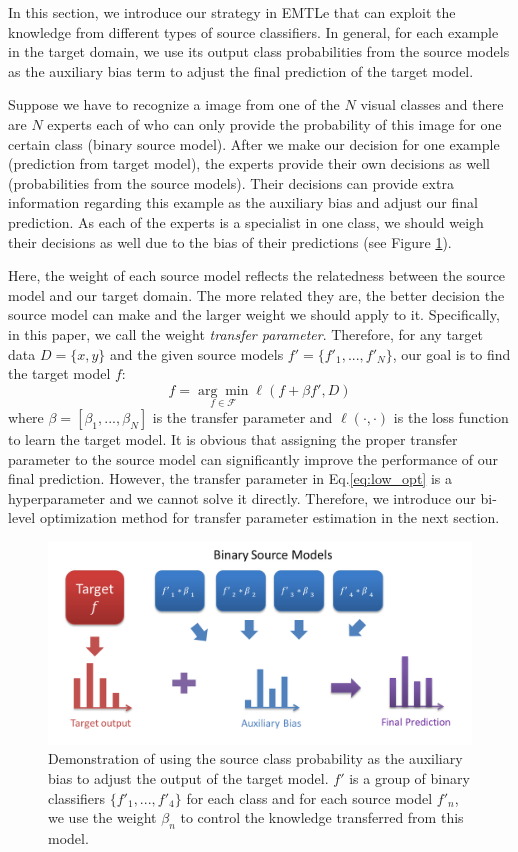 In this section, we introduce our strategy in EMTLe that can exploit the knowledge from different types of source classifiers. In general, for each example in the target domain, we use its output class probabilities from the source models as the auxiliary bias term to adjust the final prediction of the target model.

Suppose we have to recognize a image from one of the $N$ visual classes and there are $N$ experts each of who can only provide the probability of this image for one certain class (binary source model). After we make our decision for one example (prediction from target model), the experts provide their own decisions as well (probabilities from the source models). Their decisions can provide extra information regarding this example as the auxiliary bias and adjust our final prediction.
As each of the experts is a specialist in one class, we should weigh their decisions as well due to the bias of their predictions (see Figure \ref{fig:ab}). 

Here, the weight of each source model reflects the relatedness between the source model and our target domain. The more related they are, the better decision the source model can make and the larger weight we should apply to it. Specifically, in this paper, we call the weight \textit{transfer parameter}. Therefore, for any target data $D=\{x,y\}$ and the given source models $f'=\{f'_1,...,f'_N\}$, our goal is to find the target model $f$:
\begin{equation}\label{eq:low_opt}
f=\underset{f \in \mathcal{F}}{\arg \min}\ell\left(f+\beta f',D\right)
\end{equation} 
where $\beta=[\beta_1,...,\beta_N]$ is the transfer parameter and $\ell(\cdot,\cdot)$ is the loss function to learn the target model.
It is obvious that assigning the proper transfer parameter to the source model can significantly improve the performance of our final prediction.
However, the transfer parameter in Eq.\eqref{eq:low_opt} is a hyperparameter and we cannot solve it directly. Therefore, we introduce our bi-level optimization method for transfer parameter estimation in the next section.


\begin{figure}
	\centering
	\includegraphics[scale=0.5]{fig/ab.png}
	\caption{Demonstration of using the source class probability as the auxiliary bias to adjust the output of the target model. $f'$ is a group of binary classifiers $\{f'_1,...,f'_4\}$ for each class and for each source model $f'_n$, we use the weight $\beta_n$ to control the knowledge transferred from this model.}
	\label{fig:ab}
\end{figure}

